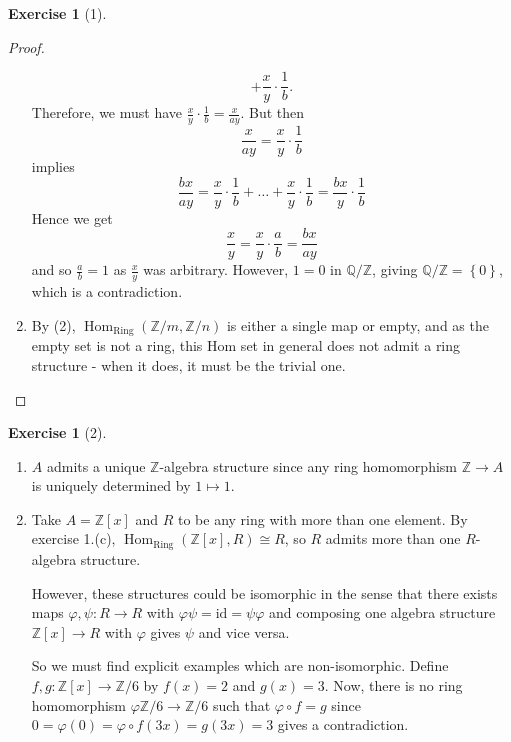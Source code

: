 \documentclass[reqno]{amsart}
\theoremstyle{definition}
\newtheorem{exercise}[theorem]{Exercise}
\theoremstyle{remark}
\DeclareMathOperator{\Hom}{Hom}
\DeclareMathOperator{\Ring}{Ring}
\newcommand{\id}{{\mathrm{id}}}
\begin{document}
\begin{exercise}[1]
\begin{proof}
\begin{enumerate}
\[        + \frac{x}{y}\cdot \frac{1}{b}.
        \] 
        Therefore, we must have
        $\frac{x}{y} \cdot  \frac{1}{b} =
        \frac{x}{ay}$.
        But then
        \[
        \frac{x}{ay} = 
        \frac{x}{y} \cdot \frac{1}{b}
        \] 
        implies
        \[
        \frac{bx}{ay} = \frac{x}{y} \cdot \frac{1}{b}+
        \ldots + \frac{x}{y} \cdot \frac{1}{b}
        = \frac{bx}{y} \cdot \frac{1}{b}
        \] 
        Hence we get
        \[
        \frac{x}{y} = \frac{x}{y} \cdot  \frac{a}{b}
        = \frac{bx}{ay}
        \] 
        and so  $\frac{a}{b} = 1$ as
        $\frac{x}{y}$ was arbitrary. However,
        $1 = 0$ in $\mathbb{Q} / \mathbb{Z}$, giving
        $\mathbb{Q} / \mathbb{Z} = \left\{ 0 \right\} $,
        which is a contradiction.
    \item By (2), 
        $\Hom_{\Ring}\left( \mathbb{Z}/m, \mathbb{Z}/n \right) $ 
        is either a single map or empty, and as
        the empty set is not a ring, this
        Hom set in general does not admit a ring
        structure - when it does, it must be
        the trivial one.
        \end{enumerate}
    \end{proof}
\end{exercise}


\begin{exercise}[2]
    \begin{enumerate}
        \item $A$ admits a unique $\mathbb{Z}$-algebra
            structure since any ring homomorphism
            $\mathbb{Z} \to A$ is uniquely determined
            by $1 \mapsto 1$.
        \item Take $A = \mathbb{Z}[x]$ and
            $R$ to be any ring with more
            than one element. By exercise 1.(c),
            $\Hom_{\Ring}\left( \mathbb{Z}[x],
            R\right) \cong R$, so
            $R$ admits more than one
            $R$-algebra structure.

            However, these structures could be isomorphic
            in the sense that there
            exists maps $\varphi , \psi  \colon
            R \to R$ with $\varphi \psi = \id = \psi  \varphi $ 
            and composing one algebra structure
            $\mathbb{Z}[x] \to R$ with $\varphi $ gives
            $\psi $ and vice versa. 

            So we must find explicit examples which
            are non-isomorphic. 
            Define 
            $f,g \colon \mathbb{Z}[x] \to \mathbb{Z}/6$ by
            $f(x) = 2$ and
            $g(x) = 3$. Now, there
            is no ring homomorphism
            $\varphi \mathbb{Z} / 6 \to \mathbb{Z}/6$
            such that $\varphi \circ f = g$ since
            $0 = \varphi (0) =\varphi \circ f(3x) = g(3x)
            = 3$ gives a contradiction.
    \end{enumerate}
\end{exercise}
\end{document}
